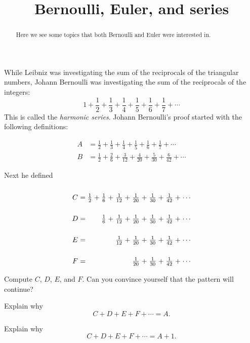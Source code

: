 \documentclass{ximera}
\title{Bernoulli, Euler, and series}
\begin{document}
\begin{abstract}
Here we see some topics that both Bernoulli and Euler were interested in.
\end{abstract}
\maketitle

While Leibniz was investigating the sum of the reciprocals of the
triangular numbers, Johann Bernoulli was investigating the sum of the
reciprocals of the integers:
\[
1 + \frac{1}{2} + \frac{1}{3} + \frac{1}{4} + \frac{1}{5} + \frac{1}{6} + \frac{1}{7}+\cdots
\]
This is called the \textit{harmonic series}.  Johann Bernoulli's proof
started with the following definitions:

\begin{align*}
A &= \frac{1}{2} + \frac{1}{3} + \frac{1}{4} + \frac{1}{5} + \frac{1}{6} + \frac{1}{7} + \cdots\\
B &= \frac{1}{2} + \frac{2}{6} + \frac{3}{12} + \frac{4}{20} + \frac{5}{30} + \frac{6}{42} + \cdots
\end{align*}

\begin{question}
Next he defined
\[
{\renewcommand{\arraystretch}{2.5}
\arraycolsep=1.4pt
\begin{array}{ccccccccccccccc}
C & = & \frac{1}{2} & + & \frac{1}{6} & + & \frac{1}{12} & + & \frac{1}{20} & + & \frac{1}{30} & + & \frac{1}{42} & + & \cdots\\
D & = &             &   & \frac{1}{6} & + & \frac{1}{12} & + & \frac{1}{20} & + & \frac{1}{30} & + & \frac{1}{42} & + & \cdots\\
E & = &             &   &             &   & \frac{1}{12} & + & \frac{1}{20} & + & \frac{1}{30} & + & \frac{1}{42} & + & \cdots\\
F & = &             &   &             &   &              &   & \frac{1}{20} & + & \frac{1}{30} & + & \frac{1}{42} & + & \cdots
\end{array}}
\]
Compute $C$, $D$, $E$, and $F$. Can you convince yourself that the pattern will continue?
\end{question}

\begin{question}
Explain why
\[
C + D + E + F + \cdots = A.
\]
\end{question}

\begin{question}
Explain why
\[
C + D + E + F + \cdots = A+1.
\]
\end{question}
\end{document}
